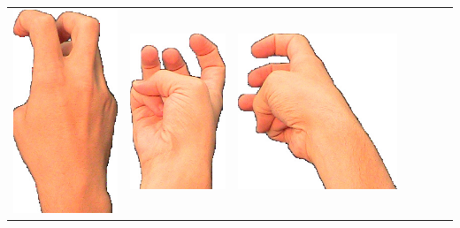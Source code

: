 \documentclass{article}
\begin{document}
\begin{center}
\begin{tabular}{r*{6}{c}}
\includegraphics[scale=0.1]{images/06-03-3.jpg}&
\includegraphics[scale=0.1]{images/06-03-4.jpg}&
\includegraphics[scale=0.1]{images/06-03-5.jpg}&

\end{tabular}
\end{center}
\end{document}
